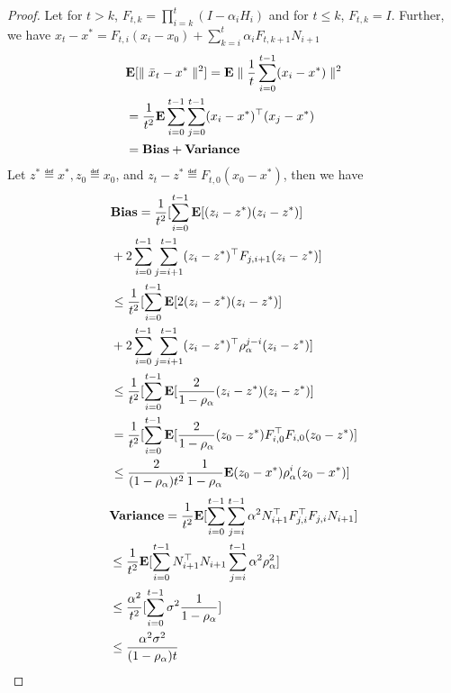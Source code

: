 \begin{proof}
Let for $t> k $, $F_{t,k}=\prod_{i=k}^t(I-\alpha_i H_i)$ and for $t\leq k$, $F_{t,k}=I$. Further, we have ${x}_t-x^*=F_{t,i} (x_i-x_0)+\sum_{k=i}^{t}\alpha_i F_{t,k+1}N_{i+1}$
\begin{align*}
&\mathbf{E}[\parallel\bar{x}_t-x^*\parallel^2]=\mathbf{E}\parallel\frac{1}{t}\sum_{i=0}^{t-1} (x_i-x^*)\parallel^2\\
&=\frac{1}{t^2}\mathbf{E}\sum_{i=0}^{t-1} \sum_{j=0}^{t-1}(x_i-x^*)^\top(x_j-x^*)\\
&=\textbf{Bias}+\textbf{Variance}
\end{align*}
Let $z^*\eqdef x^*, z_0\eqdef x_0$, and $z_t-z^*\eqdef F_{t,0}(x_0-x^*)$, then we have
\begin{align*}
&\textbf{Bias}=\frac{1}{t^2}[\sum_{i=0}^{t-1}\mathbf{E}[(z_i-z^*) (z_i-z^*)]\\&+2\sum_{i=0}^{t-1}\sum_{j=i+1}^{t-1}(z_i-z^*)^\top F_{j,i+1} (z_i-z^*)]\\
&\leq \frac{1}{t^2}[\sum_{i=0}^{t-1}\mathbf{E}[2(z_i-z^*)(z_i-z^*)]\\&+2\sum_{i=0}^{t-1}\sum_{j=i+1}^{t-1}(z_i-z^*)^\top \rho_\alpha^{j-i} (z_i-z^*)]\\
&\leq \frac{1}{t^2}[\sum_{i=0}^{t-1}\mathbf{E}[\frac{2}{1-\rho_\alpha}(z_i-z^*)(z_i-z^*)]\\
&=\frac{1}{t^2}[\sum_{i=0}^{t-1}\mathbf{E}[\frac{2}{1-\rho_\alpha}(z_0-z^*)F^\top_{i,0}F_{i,0}(z_0-z^*)]\\
&\leq \frac{2}{(1-\rho_{\alpha})t^2}\frac{1}{1-\rho_\alpha}\mathbf{E}(z_0-x^*)\rho_\alpha^i(z_0-x^*)]\\
\end{align*}
\begin{align*}
&\textbf{Variance}=\frac{1}{t^2}\mathbf{E}[\sum_{i=0}^{t-1}\sum_{j=i}^{t-1} \alpha^2 N^\top_{i+1}F^\top_{j,i} F_{j,i} N_{i+1}]\\
&\leq \frac{1}{t^2}\mathbf{E}[\sum_{i=0}^{t-1}N_{i+1}^\top N_{i+1}\sum_{j=i}^{t-1} \alpha^2 \rho_{\alpha}^2]\\
&\leq \frac{\alpha^2}{t^2}[\sum_{i=0}^{t-1}\sigma^2 \frac{1}{1-\rho_{\alpha}}]\\
&\leq \frac{\alpha^2\sigma^2}{(1-\rho_\alpha)t}
\end{align*}
\end{proof}